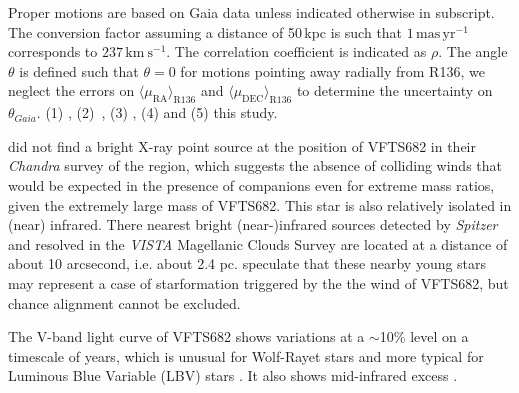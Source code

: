 \documentclass[apjl,twocolumn]{emulateapj}
\newcommand{\kms}{{\,\mathrm{km\ s^{-1}}}}
\newcommand{\masyr}{\,\mathrm{mas}\,\mathrm{yr}^{-1}}
\DeclareRobustCommand{\Secref}[1]{Sec.~\ref{#1}}
\begin{document}
\begin{table}
\begin{center}
\begin{tabular}{llc|c|c}
    \end{tabular}
    \tablecomments
    { Proper motions are based on Gaia data unless indicated otherwise
      in subscript.    The conversion factor assuming a distance of
      50\,kpc is such that $1\masyr$ corresponds to $237\kms$.  The
      correlation coefficient is indicated as $\rho$. The angle
      $\theta$ is defined such that $\theta=0$ for motions pointing
      away radially from R136, we neglect the errors on
      $\langle\mu_\mathrm{RA}\rangle_\mathrm{R136}$ and $\langle\mu_\mathrm{DEC}\rangle_\mathrm{R136}$ to determine the uncertainty
      on $\theta_{Gaia}$.
      (1) \cite{brown:18},
      (2)~\cite{bestenlehner:11},
      (3) \cite{lennon:18}, 
      (4) \cite{platais:18} and
      (5) {\color{blue}this study}.
    }
  \end{center}
  \label{tab:vfts682}
\end{table}

\cite{townsley:06} did not find
a bright X-ray point source at the position of VFTS682 in their
\emph{Chandra} survey of the region, which suggests the absence of
colliding winds that would be expected in the presence of companions
even for extreme mass ratios, given the extremely large mass of
VFTS682. This star is also relatively isolated in (near) infrared. There nearest bright (near-)infrared sources detected by \emph{Spitzer} \citep{meixner:06} and resolved in the \emph{VISTA} Magellanic Clouds Survey \citep{cioni:11} are located at a distance of about 10 arcsecond, i.e. about 2.4 pc. \cite{walborn:13} speculate that these nearby young stars may represent a case of starformation triggered by the the wind of VFTS682, but chance alignment cannot be excluded.

The V-band light curve of VFTS682  shows
variations at a $\sim$10\% level on a timescale of years, which is
unusual for Wolf-Rayet stars and more typical for Luminous Blue
Variable (LBV) stars \citep{udalski:08, bestenlehner:11}. It also
shows mid-infrared excess \citep{gruendl:09}.
\end{document}
